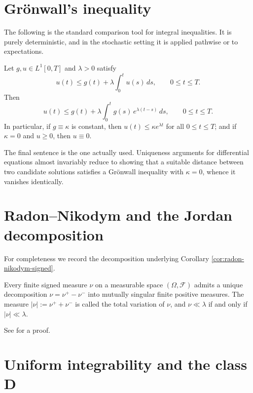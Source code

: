 \section{Grönwall's inequality}\label{app:gronwall}

The following is the standard comparison tool for integral inequalities. It is purely
deterministic, and in the stochastic setting it is applied pathwise or to expectations.

\begin{lemma}\label{lem:gronwall}
Let $g, u \in L^1[0,T]$ and $\lambda > 0$ satisfy
\[
u(t) \leq g(t) + \lambda \int_0^t u(s)\,ds, \qquad 0 \leq t \leq T.
\]
Then
\[
u(t) \leq g(t) + \lambda \int_0^t g(s)\,e^{\lambda(t-s)}\,ds, \qquad 0 \leq t \leq T.
\]
In particular, if $g \equiv \kappa$ is constant, then $u(t) \leq \kappa e^{\lambda t}$ for all
$0 \leq t \leq T$; and if $\kappa = 0$ and $u \geq 0$, then $u \equiv 0$.
\qedopentext
\end{lemma}

The final sentence is the one actually used. Uniqueness arguments for differential equations
almost invariably reduce to showing that a suitable distance between two candidate solutions
satisfies a Grönwall inequality with $\kappa = 0$, whence it vanishes identically.

\section{Radon--Nikodym and the Jordan decomposition}\label{app:radonnikodym}

For completeness we record the decomposition underlying Corollary
\ref{cor:radon-nikodym-signed}.

\begin{theorem}\label{thm:jordan}
Every finite signed measure $\nu$ on a measurable space $(\Omega,\mathcal{F})$ admits a unique
decomposition $\nu = \nu^+ - \nu^-$ into mutually singular finite positive measures. The measure
$|\nu| := \nu^+ + \nu^-$ is called the total variation of $\nu$, and $\nu \ll \lambda$ if and only
if $|\nu| \ll \lambda$.
\qedopentext
\end{theorem}

See \cite{roydenfitzpatrick2010} for a proof.


\section{Uniform integrability and the class D}\label{app:ui}

